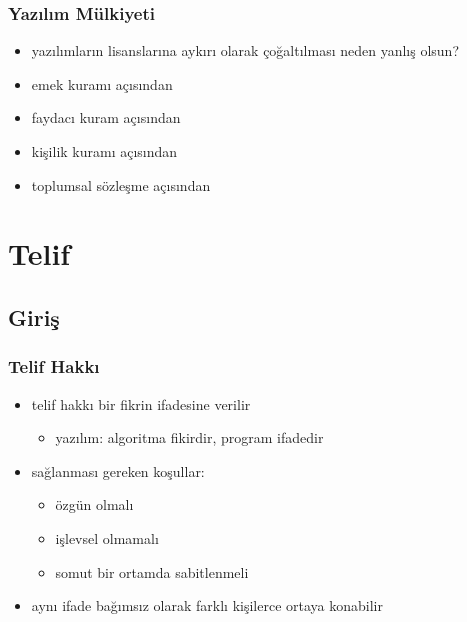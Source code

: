 \documentclass[dvipsnames]{beamer}
\theoremstyle{definition}
\theoremstyle{example}
\theoremstyle{plain}
\begin{document}
\begin{frame}
  \frametitle{Yazılım Mülkiyeti}

  \begin{itemize}
    \item yazılımların lisanslarına aykırı olarak çoğaltılması neden yanlış
      olsun?

    \pause
    \medskip
    \item emek kuramı açısından

    \pause
    \item faydacı kuram açısından

    \pause
    \item kişilik kuramı açısından

    \pause
    \item toplumsal sözleşme açısından
  \end{itemize}
\end{frame}

\section{Telif}

\subsection{Giriş}

\begin{frame}
  \frametitle{Telif Hakkı}

  \begin{itemize}
    \item telif hakkı bir fikrin \alert{ifadesine} verilir
    \begin{itemize}
      \item yazılım: algoritma fikirdir, program ifadedir
    \end{itemize}

    \pause
    \medskip
    \item sağlanması gereken koşullar:
    \begin{itemize}
      \item özgün olmalı
      \item işlevsel olmamalı
      \item somut bir ortamda sabitlenmeli
    \end{itemize}

    \pause
    \medskip
    \item aynı ifade bağımsız olarak farklı kişilerce ortaya konabilir
  \end{itemize}
\end{frame}
\end{document}
